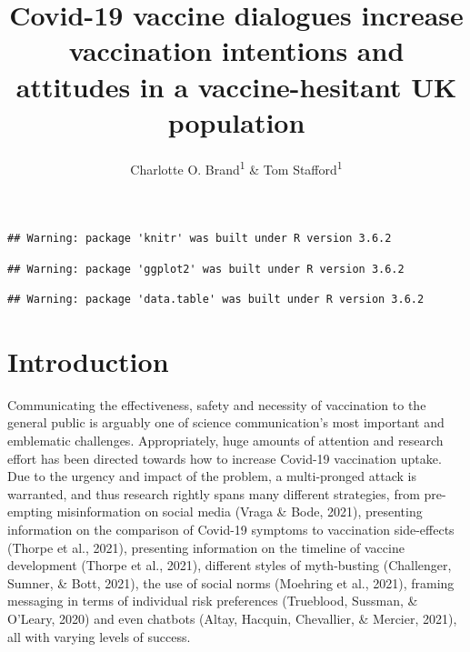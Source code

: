 \documentclass[
  english,
  ,jou,floatsintext]{apa6}
\title{Covid-19 vaccine dialogues increase vaccination intentions and attitudes in a vaccine-hesitant UK population}
\author{Charlotte O. Brand\textsuperscript{1} \& Tom Stafford\textsuperscript{1}}
\date{}
\affiliation{\vspace{0.5cm}\textsuperscript{1} University of Sheffield, Department of Psychology}
\begin{document}
\maketitle

\begin{verbatim}
## Warning: package 'knitr' was built under R version 3.6.2
\end{verbatim}

\begin{verbatim}
## Warning: package 'ggplot2' was built under R version 3.6.2
\end{verbatim}

\begin{verbatim}
## Warning: package 'data.table' was built under R version 3.6.2
\end{verbatim}

\hypertarget{introduction}{%
\section{Introduction}\label{introduction}}

Communicating the effectiveness, safety and necessity of vaccination to the general public is arguably one of science communication's most important and emblematic challenges. Appropriately, huge amounts of attention and research effort has been directed towards how to increase Covid-19 vaccination uptake. Due to the urgency and impact of the problem, a multi-pronged attack is warranted, and thus research rightly spans many different strategies, from pre-empting misinformation on social media (Vraga \& Bode, 2021), presenting information on the comparison of Covid-19 symptoms to vaccination side-effects (Thorpe et al., 2021), presenting information on the timeline of vaccine development (Thorpe et al., 2021), different styles of myth-busting (Challenger, Sumner, \& Bott, 2021), the use of social norms (Moehring et al., 2021), framing messaging in terms of individual risk preferences (Trueblood, Sussman, \& O'Leary, 2020) and even chatbots (Altay, Hacquin, Chevallier, \& Mercier, 2021), all with varying levels of success.
\end{document}
